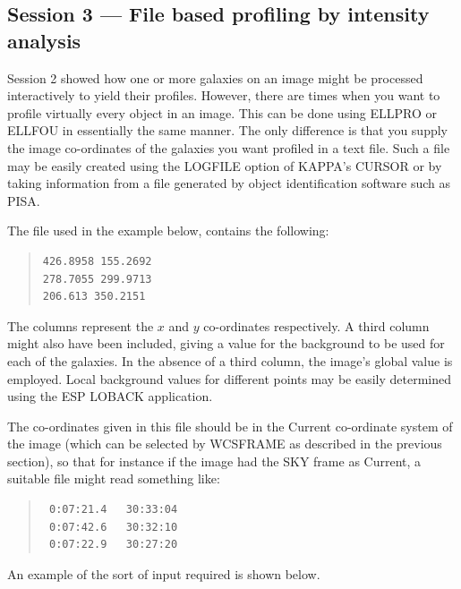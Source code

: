 \documentclass[twoside,11pt]{article}
\newcommand{\xref}[3]{#1}
\newcommand{\xlabel}[1]{}
\newenvironment{myquote}{\begin{quote}\begin{small}}{\end{small}\end{quote}}
\begin{document}
\subsection{Session 3 --- File based profiling by intensity analysis}
\xlabel{SESSION3}

Session 2 showed how one or more galaxies on an image might be
processed interactively to yield their profiles. However, there are
times when you want to profile virtually every object in an image.
This can be done using ELLPRO or ELLFOU in essentially the same manner.
The only difference is that you supply the image co-ordinates of the galaxies
you want profiled in a text file. Such a file may be easily created
using the LOGFILE option of \xref{KAPPA}{sun95}{}'s CURSOR or by taking
information from a file generated by object identification software such as
\xref{PISA}{sun109}{}.

The file used in the example below, contains the following:

\begin{myquote}
\begin{verbatim}
426.8958 155.2692
278.7055 299.9713
206.613 350.2151
\end{verbatim}
\end{myquote}

The columns represent the $x$ and $y$ co-ordinates respectively. A third column
might also have been included, giving a value for the background to be
used for each of the galaxies. In the absence of a third column, the image's
global value is employed. Local background values for different points may be
easily determined using the ESP LOBACK application.

The co-ordinates given in this file should be in the
Current co-ordinate system of the image (which can be selected by
\xref{WCSFRAME}{sun95}{WCSFRAME} as described in the previous section),
so that for instance if the image had the SKY frame as Current,
a suitable file might read something like:

\begin{myquote}
\begin{verbatim}
 0:07:21.4   30:33:04
 0:07:42.6   30:32:10
 0:07:22.9   30:27:20
\end{verbatim}
\end{myquote}

An example of the sort of input required is shown below.
\end{document}

